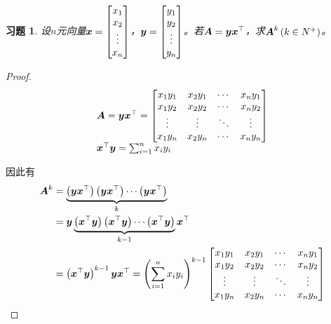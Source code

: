 \documentclass{ctexart}
\newtheorem{problem}{习题}[section]
\begin{document}
\begin{problem}
设\(n\)元向量\(\boldsymbol{x}=\begin{bmatrix}x_1\\x_2\\\vdots\\x_n\end{bmatrix}\)，\(\boldsymbol{y}=\begin{bmatrix}y_1\\y_2\\\vdots\\y_n\end{bmatrix}\)。若\(\boldsymbol{A}=\boldsymbol{y}\boldsymbol{x}^\top\)，求\(\boldsymbol{A}^k\left( k \in N^+ \right)\)。
\end{problem}
\begin{proof}
    \begin{equation*}
        \begin{array}{lll}
            \boldsymbol{A}=\boldsymbol{y}\boldsymbol{x}^\top=
            \begin{bmatrix}
                x_1y_1 & x_2y_1 & \cdots & x_ny_1 \\
                x_1y_2 & x_2y_2 & \cdots & x_ny_2 \\
                \vdots & \vdots & \ddots & \vdots \\
                x_1y_n & x_2y_n & \cdots & x_ny_n \\
            \end{bmatrix}         \\
            \boldsymbol{x}^\top\boldsymbol{y}=\sum_{i=1}^nx_iy_i \\
        \end{array}
    \end{equation*}

    因此有
    \begin{align*}
        \boldsymbol{A}^k & =\underbrace{\left( \boldsymbol{y}\boldsymbol{x}^\top \right)\left( \boldsymbol{y}\boldsymbol{x}^\top \right)\cdots\left( \boldsymbol{y}\boldsymbol{x}^\top \right)}_k                    \\
                & =\boldsymbol{y}\underbrace{\left( \boldsymbol{x}^\top\boldsymbol{y} \right)\left( \boldsymbol{x}^\top\boldsymbol{y} \right)\cdots\left( \boldsymbol{x}^\top\boldsymbol{y} \right)}_{k-1}\boldsymbol{x}^\top \\
                & =\left( \boldsymbol{x}^\top\boldsymbol{y} \right)^{k-1}\boldsymbol{y}\boldsymbol{x}^\top=\left( \sum_{i=1}^nx_iy_i \right)^{k-1}
        \begin{bmatrix}
            x_1y_1 & x_2y_1 & \cdots & x_ny_1 \\
            x_1y_2 & x_2y_2 & \cdots & x_ny_2 \\
            \vdots & \vdots & \ddots & \vdots \\
            x_1y_n & x_2y_n & \cdots & x_ny_n \\
        \end{bmatrix}
    \end{align*}
\end{proof}
\end{document}
